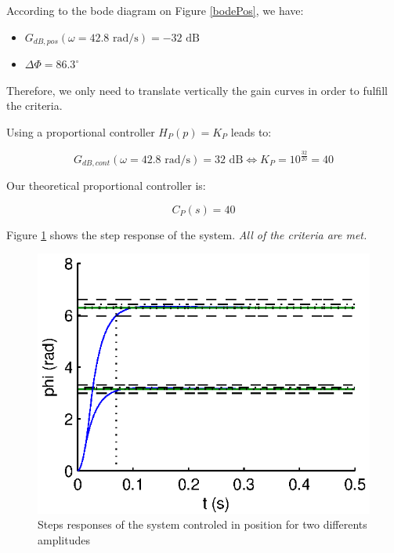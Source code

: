 According to the bode diagram on Figure \ref{bodePos}, we have:

\begin{itemize}
 \item $G_{dB,pos}(\omega = 42.8 \text{ rad/s}) = -32 \text{ dB}$
 \item $\Delta \Phi = 86.3^{\circ}$
\end{itemize}

Therefore, we only need to translate vertically the gain curves in order to fulfill the criteria.

Using a proportional controller $H_{P}(p) = K_P$ leads to:

$$ G_{dB,cont}(\omega = 42.8 \text{ rad/s}) = 32 \text{ dB} \Leftrightarrow K_P = 10^{\frac{32}{20}} = 40$$

Our theoretical proportional controller is:

$$C_{P}(s) = 40$$

Figure \ref{StepPPos} shows the step response of the system. \emph{All of the criteria are met.}

\begin{center}
\begin{figure}[ht]
 \includegraphics[width=\linewidth]{fig/StepPPos.eps}
 \caption{Steps responses of the system controled in position for two differents amplitudes}
 \label{StepPPos}
\end{figure}
\end{center}




